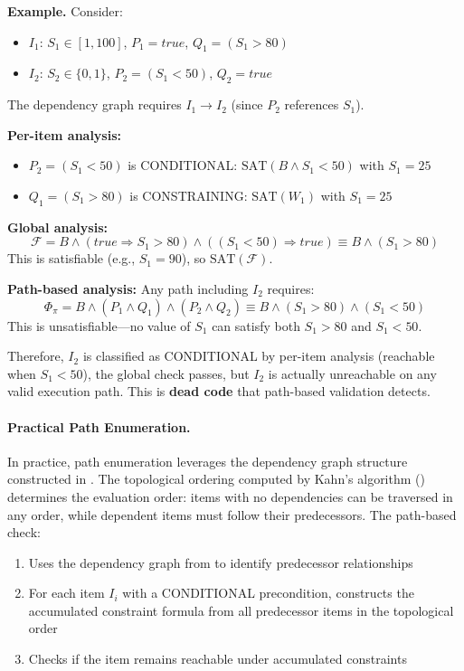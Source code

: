\begin{mdframed}
\noindent\textbf{Example.} Consider:
\begin{itemize}
    \item $I_1$: $S_1 \in [1, 100]$, $P_1 = \mathit{true}$, $Q_1 = (S_1 > 80)$
    \item $I_2$: $S_2 \in \{0, 1\}$, $P_2 = (S_1 < 50)$, $Q_2 = \mathit{true}$
\end{itemize}

The dependency graph requires $I_1 \to I_2$ (since $P_2$ references $S_1$).

\textbf{Per-item analysis:}
\begin{itemize}
    \item $P_2 = (S_1 < 50)$ is CONDITIONAL: $\mathrm{SAT}(B \wedge S_1 < 50)$ with $S_1 = 25$
    \item $Q_1 = (S_1 > 80)$ is CONSTRAINING: $\mathrm{SAT}(W_1)$ with $S_1 = 25$
\end{itemize}

\textbf{Global analysis:}
\[
\mathcal{F} = B \wedge (\mathit{true} \Rightarrow S_1 > 80) \wedge ((S_1 < 50) \Rightarrow \mathit{true}) \equiv B \wedge (S_1 > 80)
\]
This is satisfiable (e.g., $S_1 = 90$), so $\mathrm{SAT}(\mathcal{F})$.

\textbf{Path-based analysis:}
Any path including $I_2$ requires:
\[
\Phi_\pi = B \wedge (P_1 \wedge Q_1) \wedge (P_2 \wedge Q_2) \equiv B \wedge (S_1 > 80) \wedge (S_1 < 50)
\]
This is unsatisfiable—no value of $S_1$ can satisfy both $S_1 > 80$ and $S_1 < 50$.

Therefore, $I_2$ is classified as CONDITIONAL by per-item analysis (reachable when $S_1 < 50$), the global check passes, but $I_2$ is actually unreachable on any valid execution path. This is \textbf{dead code} that path-based validation detects.
\end{mdframed}

\paragraph{Practical Path Enumeration.}

In practice, path enumeration leverages the dependency graph structure constructed in . The topological ordering computed by Kahn's algorithm () determines the evaluation order: items with no dependencies can be traversed in any order, while dependent items must follow their predecessors. The path-based check:

\begin{enumerate}
    \item Uses the dependency graph from  to identify predecessor relationships
    \item For each item $I_i$ with a CONDITIONAL precondition, constructs the accumulated constraint formula from all predecessor items in the topological order
    \item Checks if the item remains reachable under accumulated constraints
\end{enumerate}

